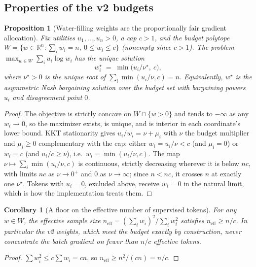 \documentclass{article} %
\newtheorem{proposition}{Proposition}
\newtheorem{corollary}{Corollary}
\begin{document}
\subsection*{Properties of the v2 budgets}

\begin{proposition}[Water-filling weights are the proportionally fair gradient allocation]
\label{prop:waterfill}
Fix utilities $u_1, \dots, u_n > 0$, a cap $c > 1$, and the budget polytope $W = \{w \in \mathbb{R}^n : \sum_i w_i = n,\ 0 \le w_i \le c\}$ (nonempty since $c > 1$). The problem $\max_{w \in W} \sum_i u_i \log w_i$ has the unique solution
\[
w_i^\star \;=\; \min\!\big(u_i/\nu^\star,\ c\big),
\]
where $\nu^\star > 0$ is the unique root of $\sum_i \min(u_i/\nu, c) = n$. Equivalently, $w^\star$ is the asymmetric Nash bargaining solution over the budget set with bargaining powers $u_i$ and disagreement point $0$.
\end{proposition}

\begin{proof}
The objective is strictly concave on $W \cap \{w > 0\}$ and tends to $-\infty$ as any $w_i \to 0$, so the maximizer exists, is unique, and is interior in each coordinate's lower bound. KKT stationarity gives $u_i / w_i = \nu + \mu_i$ with $\nu$ the budget multiplier and $\mu_i \ge 0$ complementary with the cap: either $w_i = u_i/\nu < c$ (and $\mu_i = 0$) or $w_i = c$ (and $u_i/c \ge \nu$), i.e.\ $w_i = \min(u_i/\nu, c)$. The map $\nu \mapsto \sum_i \min(u_i/\nu, c)$ is continuous, strictly decreasing wherever it is below $nc$, with limits $nc$ as $\nu \to 0^+$ and $0$ as $\nu \to \infty$; since $n < nc$, it crosses $n$ at exactly one $\nu^\star$. Tokens with $u_i = 0$, excluded above, receive $w_i = 0$ in the natural limit, which is how the implementation treats them.
\end{proof}

\begin{corollary}[A floor on the effective number of supervised tokens]
\label{cor:ess}
For any $w \in W$, the effective sample size $n_{\mathrm{eff}} = (\sum_i w_i)^2 / \sum_i w_i^2$ satisfies $n_{\mathrm{eff}} \ge n / c$. In particular the v2 weights, which meet the budget exactly by construction, never concentrate the batch gradient on fewer than $n/c$ effective tokens.
\end{corollary}

\begin{proof}
$\sum w_i^2 \le c \sum w_i = cn$, so $n_{\mathrm{eff}} \ge n^2 / (cn) = n/c$.
\end{proof}
\end{document}
